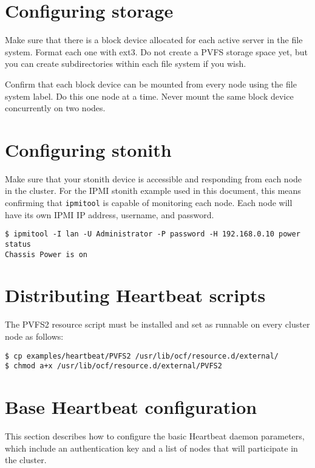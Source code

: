 \documentclass[11pt]{article}
\begin{document}
\section{Configuring storage}

Make sure that there is a block device allocated for each active server
in the file system.  Format each one with ext3.  Do not create a PVFS
storage space yet, but you can create subdirectories within each file
system if you wish.

Confirm that each block device can be mounted from every node using the
file system label.  Do this one node at a time.  Never mount
the same block device concurrently on two nodes.

\section{Configuring stonith}

Make sure that your stonith device is accessible and responding from each
node in the cluster.  For the IPMI stonith example used in this document,
this means confirming that \texttt{ipmitool} is capable of monitoring
each node.  Each node will have its own IPMI IP address, username, and
password.

\begin{verbatim}
$ ipmitool -I lan -U Administrator -P password -H 192.168.0.10 power status
Chassis Power is on
\end{verbatim}

\section{Distributing Heartbeat scripts}

The PVFS2 resource script must be installed and set as runnable on every
cluster node as follows:

\begin{verbatim}
$ cp examples/heartbeat/PVFS2 /usr/lib/ocf/resource.d/external/
$ chmod a+x /usr/lib/ocf/resource.d/external/PVFS2
\end{verbatim}

\section{Base Heartbeat configuration}

This section describes how to configure the basic Heartbeat daemon
parameters, which include an authentication key and a list of nodes that
will participate in the cluster.
\end{document}
